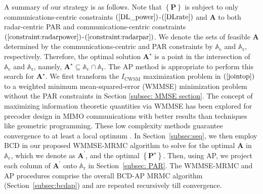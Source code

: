 \documentclass[10pt,journal]{IEEEtran}
\newcommand{\paren}[1]{\left({#1}\right)}
\newcommand{\braces}[1]{{\left\{ {#1}\right\}}}
\theoremstyle{definition}
\begin{document}
A summary of our strategy is as follows. Note that ${\braces{\mathbf{P}}}$ is subject to only communications-centric constraints $\paren{\mathrm{\ref{DL_power}}}$-$\paren{\mathrm{\ref{DLrate}}}$ and $\mathbf{A}$ to both radar-centric PAR and communications-centric constraints $\paren{\mathrm{\ref{constraint:radarpower}}}$-$\paren{\mathrm{\ref{constraint:radarpar}}}$. %
We denote the sets of feasible $\mathbf{A}$ determined by the communications-centric and PAR constraints by $\mathbb{A}_{\textrm{c}}$ and $\mathbb{A}_{\textrm{r}}$, respectively. Therefore, the optimal solution %
$\mathbf{A}^\star$ is a point in the intersection of $\mathbb{A}_{\textrm{c}}$ and $\mathbb{A}_{\textrm{r}}$, namely, $\mathbf{A}^\star\subseteq\mathbb{A}_{\textrm{c}}\cap\mathbb{A}_{\textrm{r}}$. The AP method \cite{arXiv180203889Z,nearestvector} is appropriate to perform this search for $\mathbf{A}^\star$. We first transform the $I_{\textrm{CWSM}}$ maximization problem in $\paren{\ref{jointop}}$ to a weighted minimum mean-squared-error (WMMSE) minimization problem without the PAR constraints in Section \ref{subsec: MMSE section}. The concept of maximizing information theoretic quantities via WMMSE has been explored for precoder design in MIMO communications \cite{Luo2011IterativeWMMSE,FD_WMMSE} with better results than techniques like  geometric programming. These low complexity methods guarantee convergence to at least a local optimum \cite{Luo2011IterativeWMMSE}. In Section~\ref{subsec:seq}, we then employ BCD in our proposed WMMSE-MRMC algorithm to solve for the optimal $\mathbf{A}$ in $\mathbb{A}_{\textrm{c}}$, which we denote as $\mathbf{A}^\prime$, and the optimal %
$\braces{\mathbf{P}^\star}$. %
   Then, using AP, we project each column of $\mathbf{A}^\prime$ onto $\mathbb{A}_{\textrm{r}}$ in Section~\ref{subsec: PAR}. The WMMSE-MRMC and AP procedures comprise the overall BCD-AP MRMC algorithm (Section~\ref{subsec:bcdap}) and are repeated recursively till convergence.
\end{document}
